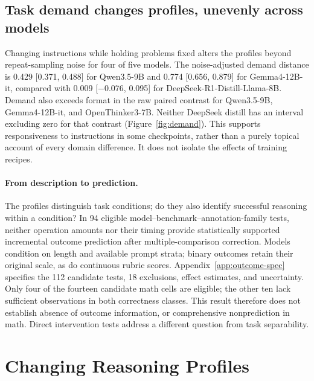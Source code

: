 \subsection{Task demand changes profiles, unevenly across models}
Changing instructions while holding problems fixed alters the profiles beyond repeat-sampling noise for four of five models. The noise-adjusted demand distance is 0.429 [0.371, 0.488] for Qwen3.5-9B and 0.774 [0.656, 0.879] for Gemma4-12B-it, compared with 0.009 [$-0.076$, 0.095] for DeepSeek-R1-Distill-Llama-8B. Demand also exceeds format in the raw paired contrast for Qwen3.5-9B, Gemma4-12B-it, and OpenThinker3-7B. Neither DeepSeek distill has an interval excluding zero for that contrast (Figure~\ref{fig:demand}). This supports responsiveness to instructions in some checkpoints, rather than a purely topical account of every domain difference. It does not isolate the effects of training recipes.

\paragraph{From description to prediction.}
The profiles distinguish task conditions; do they also identify successful reasoning within a condition? In 94 eligible model--benchmark--annotation-family tests, neither operation amounts nor their timing provide statistically supported incremental outcome prediction after multiple-comparison correction. Models condition on length and available prompt strata; binary outcomes retain their original scale, as do continuous rubric scores. Appendix~\ref{app:outcome-spec} specifies the 112 candidate tests, 18 exclusions, effect estimates, and uncertainty. Only four of the fourteen candidate math cells are eligible; the other ten lack sufficient observations in both correctness classes. This result therefore does not establish absence of outcome information, or comprehensive nonprediction in math. Direct intervention tests address a different question from task separability.

\section{Changing Reasoning Profiles}
\label{sec:interventions}
